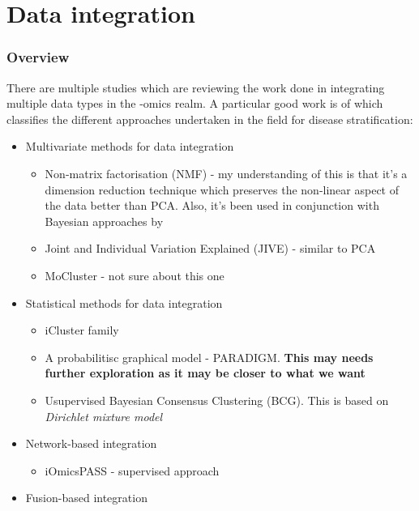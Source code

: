 
\section{Data integration}

\subsubsection{Overview}

There are multiple studies \citet{Menyhart2021-ef, Subramanian2020-tk, Picard2021-qr, Reel2021-sg} which are reviewing the work done in integrating multiple data types in the -omics realm. A particular good work is of \citet{Menyhart2021-ef} which classifies the different approaches undertaken in the field for disease stratification:
\begin{itemize}
    \item Multivariate methods for data integration
        \begin{itemize}
            \item Non-matrix factorisation (NMF) - my understanding of this is that it's a dimension reduction technique which preserves the non-linear aspect of the data better than PCA. Also, it's been used in conjunction with Bayesian approaches by \citet{Robertson2017-mg}
            \item Joint and Individual Variation Explained (JIVE) - similar to PCA
            \item MoCluster \cite{Meng2016-ui} - not sure about this one
        \end{itemize}
    \item Statistical methods for data integration
        \begin{itemize}
            \item iCluster family \citet{Shen2009-ew, Mo2013-zi, Mo2018-el}
            \item A probabilitisc graphical model - PARADIGM. \textbf{This may needs further exploration as it may be closer to what we want}
            \item Usupervised Bayesian Consensus Clustering (BCG). This is based on \textit{Dirichlet mixture model}
        \end{itemize}
    \item Network-based integration
        \begin{itemize}
            \item iOmicsPASS - supervised approach
        \end{itemize}
    \item Fusion-based integration

\end{itemize}
